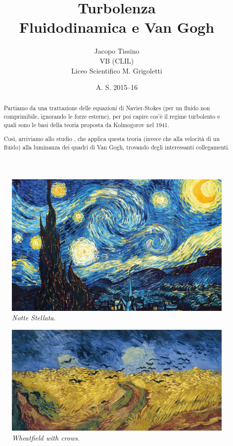 \documentclass[12pt,a4paper]{article}
\author{Jacopo Tissino \\
VB
(CLIL)\\
Liceo Scientifico M. Grigoletti}
\date{A. S. 2015--16}
\title{\huge{\textbf{Turbolenza}}\\
\Large{Fluidodinamica e Van Gogh}}
\numberwithin{equation}{section}
\begin{document}
\maketitle

\begin{abstract}
Partiamo da una trattazione delle equazioni di Navier-Stokes (per un fluido non comprimibile, ignorando le forze esterne), per poi capire cos'è il regime turbolento e quali sono le basi della teoria proposta da Kolmogorov nel 1941.

Così, arriviamo allo studio \cite{study2006}, che applica questa teoria (invece che alla velocità di un fluido) alla luminanza dei quadri di Van Gogh, trovando degli interessanti collegamenti.
\end{abstract}

\begin{figure}[h]
    \centering
    \includegraphics[scale=0.15]{the-starry-night-1889.jpg}
    \caption{\emph{Notte Stellata}.}
    \label{starrynight}
\end{figure}

\begin{figure}
    \centering
    \includegraphics[scale=0.12]{wheatfield.jpg}
    \caption{\emph{Wheatfield with crows}.}
    \label{wheatfield}
\end{figure}
\end{document}
